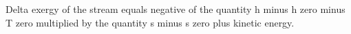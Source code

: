 Delta exergy of the stream equals negative of the quantity h minus h zero minus T zero multiplied by the quantity s minus s zero plus kinetic energy.